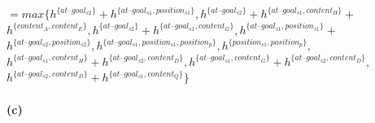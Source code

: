 \documentclass[11pt,a4paper]{article}
\newcommand{\h}[0]{\text{--}}
\begin{document}
\hphantom{tab}$=max\{h^{\{at\h goal_{s2}\}}+h^{\{at\h goal_{s1},position_{s1}\}},h^{\{at\h goal_{s2}\}}+h^{\{at\h goal_{s1},content_H\}}+$\\
\hphantom{tabta}$h^{\{content_A,content_E\}},h^{\{at\h goal_{s2}\}}+h^{\{at\h goal_{s1},content_G\}},h^{\{at\h goal_{s1},position_{s1}\}}+$\\
\hphantom{tabta}$h^{\{at\h goal_{s2},position_{s2}\}},h^{\{at\h goal_{s1},position_{s1},position_{p}\}},h^{\{position_{s1},position_{p}\}},$\\
\hphantom{tabta}$h^{\{at\h goal_{s1},content_H\}}+h^{\{at\h goal_{s2},content_D\}},h^{\{at\h goal_{s1},content_G\}}+h^{\{at\h goal_{s2},content_D\}},$\\
\hphantom{tabta}$h^{\{at\h goal_{s2},content_D\}}+h^{\{at\h goal_{s1},content_Q\}}\}$\\
\\
\textbf{(c)}\\

\label{lastpage}
\end{document}
